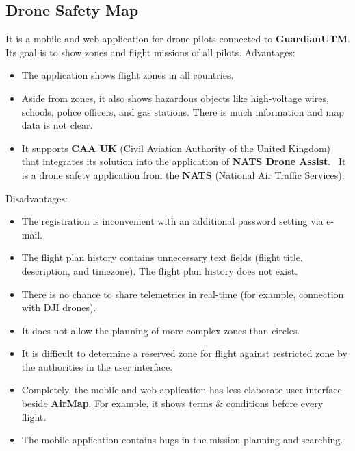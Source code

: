 \subsection{Drone Safety Map}\label{subsec:drone-safety-map}
It is a mobile and web application for drone pilots connected to \textbf{GuardianUTM}.
Its goal is to show zones and flight missions of all pilots.
\newline
\newline
Advantages:
\begin{itemize}
    \item The application shows flight zones in all countries.
    \item Aside from zones, it also shows hazardous objects like high-voltage wires, schools, police officers, and gas stations.
    There is much information and map data is not clear.
    \item It supports \textbf{CAA UK} (Civil Aviation Authority of the United Kingdom) that integrates its solution into the application of \textbf{NATS Drone Assist}.~\cite{droneAssist}
    It is a drone safety application from the \textbf{NATS} (National Air Traffic Services).
\end{itemize}
Disadvantages:
\begin{itemize}
    \item The registration is inconvenient with an additional password setting via e-mail.
    \item The flight plan history contains unnecessary text fields (flight title, description, and timezone).
    The flight plan history does not exist.
    \item There is no chance to share telemetries in real-time (for example, connection with DJI drones).
    \item It does not allow the planning of more complex zones than circles.
    \item It is difficult to determine a reserved zone for flight against restricted zone by the authorities in the user interface.
    \item Completely, the mobile and web application has less elaborate user interface beside \textbf{AirMap}.
    For example, it shows terms \& conditions before every flight.
    \item The mobile application contains bugs in the mission planning and searching.
\end{itemize}
